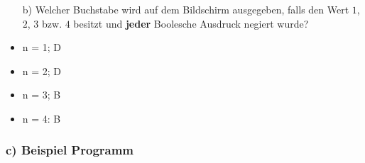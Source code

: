\begin{frame}[t]%
    \frametitle{\stitle}

\begin{itemize}
\item[b)] Welcher Buchstabe wird auf dem Bildschirm ausgegeben, falls  den Wert $1$, $2$, $3$ bzw. $4$ besitzt und \textbf{jeder} Boolesche Ausdruck negiert wurde?
\end{itemize}

\pause

\begin{center}
\begin{minipage}{0.4\textwidth}
\begin{itemize}
\item n = 1; D
\item n = 2; D
\end{itemize}
\end{minipage}
\begin{minipage}{0.5\textwidth}
\begin{itemize}
\item n = 3; B
\item n = 4: B
\end{itemize}
\end{minipage}
\end{center}

\end{frame}


\begin{frame}[fragile]%
 \frametitle{c) Beispiel Programm}%

\end{frame}
